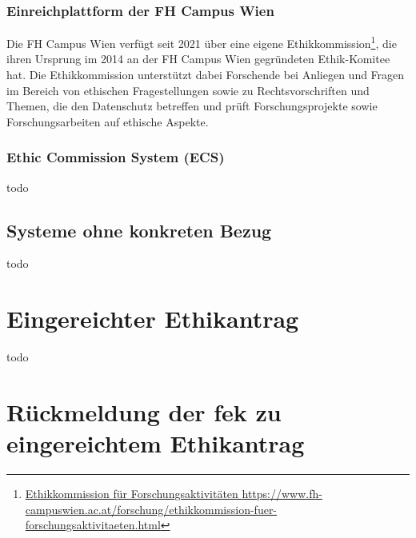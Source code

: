 \documentclass[a4paper,12pt,twoside]{scrreprt}
\begin{document}
\subsection{Einreichplattform der FH Campus Wien}
\label{sub-sec:einreichplattform-fh-campus-wien}

Die FH Campus Wien verfügt seit 2021 über eine eigene Ethikkommission\footnote{\href{https://www.fh-campuswien.ac.at/forschung/ethikkommission-fuer-forschungsaktivitaeten.html}{Ethikkommission für Forschungsaktivitäten \url{https://www.fh-campuswien.ac.at/forschung/ethikkommission-fuer-forschungsaktivitaeten.html}}}, die ihren Ursprung im 2014 an der FH Campus Wien gegründeten Ethik-Komitee hat. Die Ethikkommission unterstützt dabei Forschende bei Anliegen und Fragen im Bereich von ethischen Fragestellungen sowie zu Rechtsvorschriften und Themen, die den Datenschutz betreffen und prüft Forschungsprojekte sowie Forschungsarbeiten auf ethische Aspekte. \cite{fh_campus_wien_ethikkommission_2023}



\subsection{Ethic Commission System (ECS)}
\label{sub-sec:ecs}

todo

\section{Systeme ohne konkreten Bezug}
\label{sec:systeme-ohne-bezug}

todo

\clearpage
{}
{}
\printbibliography

\appendix

\chapter{Eingereichter Ethikantrag}
\label{appendix:eingereichter-ethikantrag}

todo



\chapter{Rückmeldung der \acs{fek} zu eingereichtem Ethikantrag}
\label{appendix:rückmeldung-fek}
\end{document}
